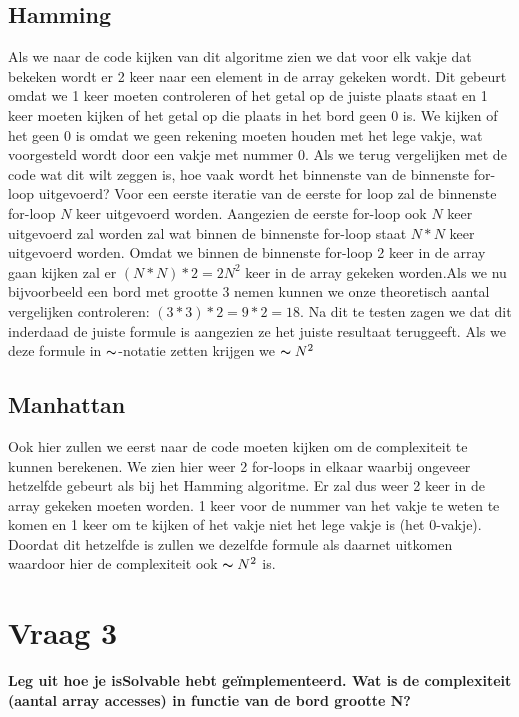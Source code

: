\documentclass[12pt, letterpaper]{article}
\begin{document}
\subsection*{Hamming}
Als we naar de code kijken van dit algoritme zien we dat voor elk vakje dat bekeken wordt er 2 
keer naar een element in de array gekeken wordt. Dit gebeurt omdat we 1 keer moeten controleren 
of het getal op de juiste plaats staat en 1 keer moeten kijken of het getal op die plaats in het
bord geen 0 is. We kijken of het geen 0 is omdat we geen rekening moeten houden met het lege vakje,
wat voorgesteld wordt door een vakje met nummer 0. Als we terug vergelijken met de code wat dit wilt
zeggen is, hoe vaak wordt het binnenste van de binnenste for-loop uitgevoerd? Voor een eerste iteratie
van de eerste for loop zal de binnenste for-loop $N$ keer uitgevoerd worden. Aangezien de eerste for-loop
ook $N$ keer uitgevoerd zal worden zal wat binnen de binnenste for-loop staat $N * N$ keer uitgevoerd worden.
Omdat we binnen de binnenste for-loop 2 keer in de array gaan kijken zal er $(N * N) * 2 = 2N^2$ keer in de 
array gekeken worden.Als we nu bijvoorbeeld een bord met grootte 3 nemen kunnen we onze theoretisch aantal 
vergelijken controleren: $(3 * 3) * 2 = 9 * 2 = 18$. Na dit te testen zagen we dat dit inderdaad de juiste 
formule is aangezien ze het juiste resultaat teruggeeft. Als we deze formule in $\thicksim$-notatie zetten 
krijgen we $\thicksim N^2$ 

\subsection*{Manhattan}
Ook hier zullen we eerst naar de code moeten kijken om de complexiteit te kunnen berekenen. We zien hier
weer 2 for-loops in elkaar waarbij ongeveer hetzelfde gebeurt als bij het Hamming algoritme. Er zal dus weer
2 keer in de array gekeken moeten worden. 1 keer voor de nummer van het vakje te weten te komen en 1 keer om 
te kijken of het vakje niet het lege vakje is (het 0-vakje). Doordat dit hetzelfde is zullen we dezelfde formule
als daarnet uitkomen waardoor hier de complexiteit ook $\thicksim N^2$ is.

\section{Vraag 3}
\textbf{Leg uit hoe je isSolvable hebt geïmplementeerd. Wat is de complexiteit (aantal array accesses) in functie van de bord grootte N?}
\end{document}
